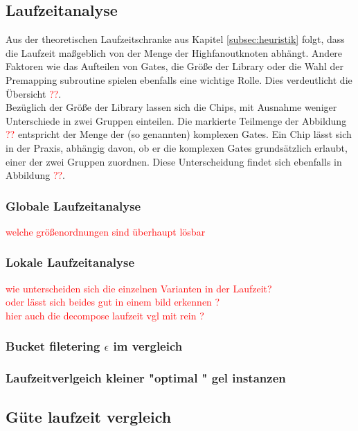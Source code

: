 \documentclass[11pt, a4paper, german]{article}
\begin{document}
 \subsection{Laufzeitanalyse}
 \label{subsec:laufzeitanalyse}
Aus der theoretischen Laufzeitschranke aus Kapitel \ref{subsec:heuristik} folgt, dass die Laufzeit maßgeblich von der Menge der Highfanoutknoten abhängt. Andere Faktoren wie das Aufteilen von Gates, die Größe der Library oder die Wahl der Premapping subroutine spielen ebenfalls eine wichtige Rolle. Dies verdeutlicht die Übersicht \textcolor{red}{??}.\\
 Bezüglich der Größe der Library lassen sich die Chips, mit Ausnahme weniger Unterschiede in zwei Gruppen einteilen. Die markierte Teilmenge der Abbildung \textcolor{red}{??} entspricht der Menge der (so genannten) komplexen Gates. Ein Chip lässt sich in der Praxis, abhängig davon, ob er die komplexen Gates grundsätzlich erlaubt, einer der zwei Gruppen zuordnen. Diese Unterscheidung findet sich ebenfalls in Abbildung \textcolor{red}{??}.
 
\subsubsection{Globale Laufzeitanalyse}
\textcolor{red}{welche größenordnungen sind überhaupt lösbar}

\subsubsection{Lokale Laufzeitanalyse}
\textcolor{red}{wie unterscheiden sich die einzelnen Varianten in der Laufzeit? \\ oder lässt sich beides gut in einem bild erkennen ?} \\

\textcolor{red}{hier auch die decompose laufzeit vgl mit rein ?}

\subsubsection{Bucket filetering $\epsilon$ im vergleich } 
 
\subsubsection{Laufzeitverlgeich kleiner "optimal " gel instanzen}


\subsection{Güte laufzeit vergleich}
\end{document}
